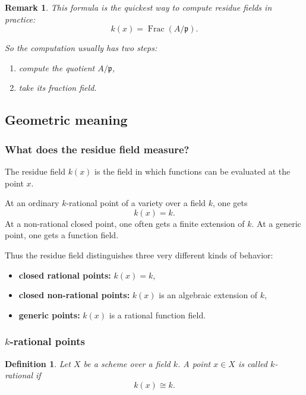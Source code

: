 \documentclass[12pt,a4paper]{article}
\theoremstyle{notespace}
\newtheorem{definition}{Definition}[section]
\newtheorem{remark}{Remark}[section]
\newcommand{\Frac}{\operatorname{Frac}}
\newcommand{\p}{\mathfrak p}
\theoremstyle{definition}
\begin{document}
\begin{remark}
	This formula is the quickest way to compute residue fields in practice:
	\[
	\boxed{
		k(x)=\Frac(A/\p).
	}
	\]
	
	So the computation usually has two steps:
	\begin{enumerate}[leftmargin=2em]
		\item compute the quotient \(A/\p\),
		\item take its fraction field.
	\end{enumerate}
\end{remark}

\subsection{Geometric meaning}

\subsubsection{What does the residue field measure?}

The residue field \(k(x)\) is the field in which functions can be evaluated at the point \(x\).

At an ordinary \(k\)-rational point of a variety over a field \(k\), one gets
\[
k(x)=k.
\]
At a non-rational closed point, one often gets a finite extension of \(k\).  
At a generic point, one gets a function field.

Thus the residue field distinguishes three very different kinds of behavior:

\begin{itemize}[leftmargin=2em]
	\item \textbf{closed rational points:} \(k(x)=k\),
	\item \textbf{closed non-rational points:} \(k(x)\) is an algebraic extension of \(k\),
	\item \textbf{generic points:} \(k(x)\) is a rational function field.
\end{itemize}

\subsubsection{\(k\)-rational points}

\begin{definition}
	Let \(X\) be a scheme over a field \(k\).  
	A point \(x\in X\) is called \emph{\(k\)-rational} if
	\[
	k(x)\cong k.
	\]
\end{definition}
\end{document}
